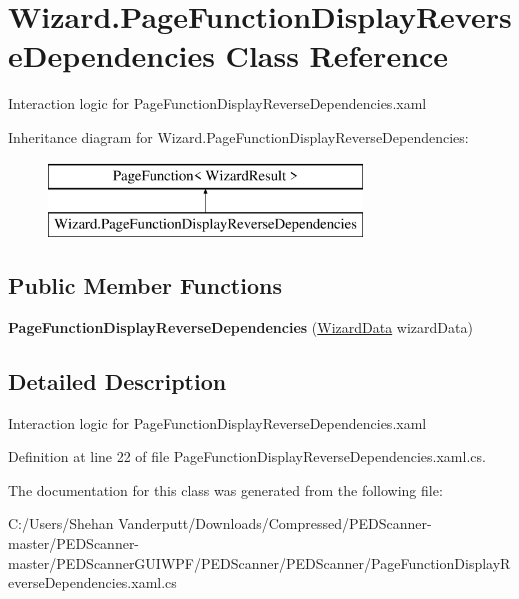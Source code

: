 \hypertarget{class_wizard_1_1_page_function_display_reverse_dependencies}{}\section{Wizard.\+Page\+Function\+Display\+Reverse\+Dependencies Class Reference}
\label{class_wizard_1_1_page_function_display_reverse_dependencies}


Interaction logic for Page\+Function\+Display\+Reverse\+Dependencies.\+xaml  


Inheritance diagram for Wizard.\+Page\+Function\+Display\+Reverse\+Dependencies\+:\begin{figure}[H]
\begin{center}
\leavevmode
\includegraphics[height=2.000000cm]{class_wizard_1_1_page_function_display_reverse_dependencies}
\end{center}
\end{figure}
\subsection*{Public Member Functions}
\begin{DoxyCompactItemize}
\item 
\mbox{\label{class_wizard_1_1_page_function_display_reverse_dependencies_a0e704879bfa179c39d73759727fdc6be}} 
{\bfseries Page\+Function\+Display\+Reverse\+Dependencies} (\mbox{\hyperlink{class_wizard_1_1_wizard_data}{Wizard\+Data}} wizard\+Data)
\end{DoxyCompactItemize}


\subsection{Detailed Description}
Interaction logic for Page\+Function\+Display\+Reverse\+Dependencies.\+xaml 



Definition at line 22 of file Page\+Function\+Display\+Reverse\+Dependencies.\+xaml.\+cs.



The documentation for this class was generated from the following file\+:\begin{DoxyCompactItemize}
\item 
C\+:/\+Users/\+Shehan Vanderputt/\+Downloads/\+Compressed/\+P\+E\+D\+Scanner-\/master/\+P\+E\+D\+Scanner-\/master/\+P\+E\+D\+Scanner\+G\+U\+I\+W\+P\+F/\+P\+E\+D\+Scanner/\+P\+E\+D\+Scanner/Page\+Function\+Display\+Reverse\+Dependencies.\+xaml.\+cs\end{DoxyCompactItemize}

